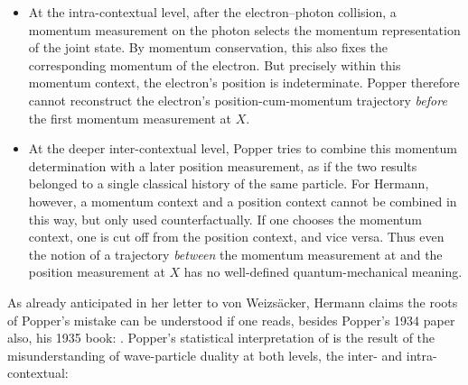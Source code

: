 \documentclass[final,12pt]{article}
\newcommand{\vW}{von Weizsäcker\xspace}
\newcommand{\NGQ}[2]{\autocite[#1/#2]{Hermann1935}}
\begin{document}
\begin{itemize}
\item At the intra-contextual level, after the electron--photon collision, a momentum measurement on the photon selects the momentum representation of the joint state. By momentum conservation, this also fixes the corresponding momentum of the electron. But precisely within this momentum context, the electron's position is indeterminate. Popper therefore cannot reconstruct the electron's position-cum-momentum trajectory \emph{before} the first momentum measurement at $X$.

\item At the deeper inter-contextual level, Popper tries to combine this momentum determination with a later position measurement, as if the two results belonged to a single classical history of the same particle. For Hermann, however, a momentum context and a position context cannot be combined in this way, but only used counterfactually. If one chooses the momentum context, one is cut off from the position context, and vice versa. Thus even the notion of a trajectory \emph{between} the momentum measurement at and the position measurement at $X$ has no well-defined quantum-mechanical meaning.
\end{itemize}
% 
As already anticipated in her letter to \vW, Hermann claims the roots of Popper's mistake can be understood if one reads, besides Popper's 1934 paper also, his 1935 book:  \NGQ{263}{123\fn{10}}. Popper's statistical interpretation of \qm is the result of the misunderstanding of wave-particle duality at both levels, the inter- and intra-contextual:
\end{document}
